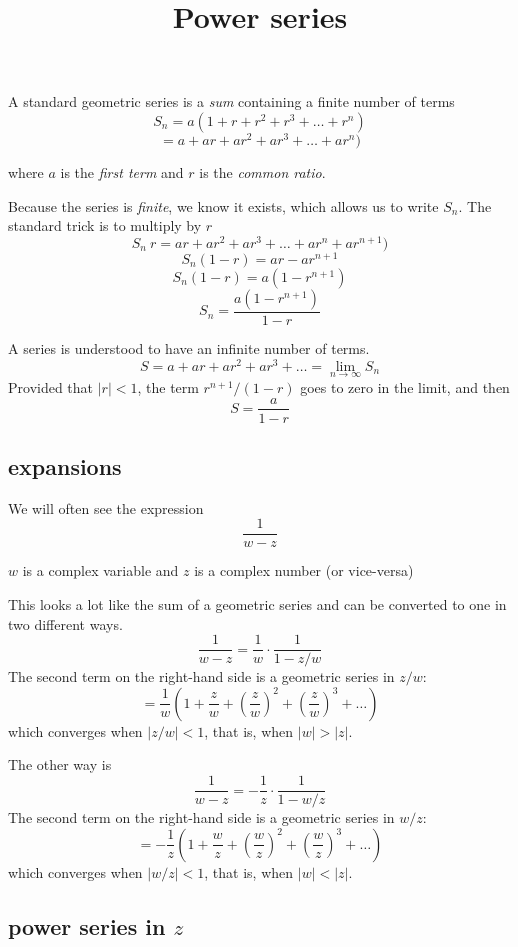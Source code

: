 \documentclass[11pt, oneside]{article}
\title{Power series}
\date{}
\begin{document}
\maketitle
\Large


A standard geometric series is a \emph{sum} containing a finite number of terms
\[ S_n = a(1 + r + r^2 + r^3 + \dots + r^n) \]
\[ = a + ar + ar^2 + ar^3 + \dots + ar^n) \]

where $a$ is the \emph{first term} and $r$ is the \emph{common ratio}.

Because the series is \emph{finite}, we know it exists, which allows us to write $S_n$.  The standard trick is to multiply by $r$
\[ S_n \ r = ar + ar^2 + ar^3 + \dots + ar^n + ar^{n+1}) \]
\[ S_n (1 - r) = ar - ar^{n+1} \]
\[ S_n (1 - r) = a(1 - r^{n+1}) \]
\[ S_n = \frac{a(1 - r^{n+1})}{1 - r} \]

A series is understood to have an infinite number of terms.
\[ S = a + ar + ar^2 + ar^3 + \dots = \lim_{n \rightarrow \infty} S_n \]
Provided that $|r| < 1$, the term $r^{n+1}/(1-r)$ goes to zero in the limit, and then
\[ S = \frac{a}{1-r} \]

\subsection*{expansions}
We will often see the expression 
\[ \frac{1}{w - z} \]

$w$ is a complex variable and $z$ is a complex number (or vice-versa)

This looks a lot like the sum of a geometric series and can be converted to one in two different ways.
\[ \frac{1}{w - z} = \frac{1}{w} \cdot \frac{1}{1 - z/w} \]
The second term on the right-hand side is a geometric series in $z/w$:
\[ =  \frac{1}{w} (1 + \frac{z}{w} + (\frac{z}{w})^2 + (\frac{z}{w})^3 + \dots ) \]
which converges when $|z/w| < 1$, that is, when $|w| > |z|$.

The other way is
\[ \frac{1}{w - z} = -\frac{1}{z} \cdot \frac{1}{1 - w/z} \]
The second term on the right-hand side is a geometric series in $w/z$:
\[ =  -\frac{1}{z} (1 + \frac{w}{z} + (\frac{w}{z})^2 + (\frac{w}{z})^3 + \dots ) \]
which converges when $|w/z| < 1$, that is, when $|w| < |z|$.

\subsection*{power series in $z$}
\end{document}
